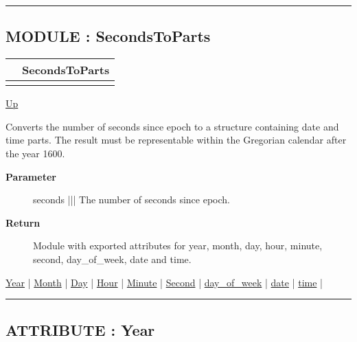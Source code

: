 \rule{\textwidth}{0.4pt}
\subsection*{MODULE : SecondsToParts}
\hypertarget{ecldoc:date.secondstoparts}{}

{\renewcommand{\arraystretch}{1.5}
\begin{tabularx}{\textwidth}{|>{\raggedright\arraybackslash}l|X|}
\hline
\hspace{0pt} & SecondsToParts \\
\hline
\multicolumn{2}{|>{\raggedright\arraybackslash}X|}{\hspace{0pt}(Seconds\_t seconds)} \\
\hline
\end{tabularx}
}

\hyperlink{ecldoc:Date}{Up}

\par
Converts the number of seconds since epoch to a structure containing date and time parts. The result must be representable within the Gregorian calendar after the year 1600.

\par
\begin{description}
\item [\textbf{Parameter}] seconds ||| The number of seconds since epoch.
\item [\textbf{Return}] Module with exported attributes for year, month, day, hour, minute, second, day\_of\_week, date and time.
\end{description}

\hyperlink{ecldoc:date.secondstoparts.result.year}{Year}  |
\hyperlink{ecldoc:date.secondstoparts.result.month}{Month}  |
\hyperlink{ecldoc:date.secondstoparts.result.day}{Day}  |
\hyperlink{ecldoc:date.secondstoparts.result.hour}{Hour}  |
\hyperlink{ecldoc:date.secondstoparts.result.minute}{Minute}  |
\hyperlink{ecldoc:date.secondstoparts.result.second}{Second}  |
\hyperlink{ecldoc:date.secondstoparts.result.day_of_week}{day\_of\_week}  |
\hyperlink{ecldoc:date.secondstoparts.result.date}{date}  |
\hyperlink{ecldoc:date.secondstoparts.result.time}{time}  |

\rule{\textwidth}{0.4pt}

\subsection*{ATTRIBUTE : Year}
\hypertarget{ecldoc:date.secondstoparts.result.year}{}

